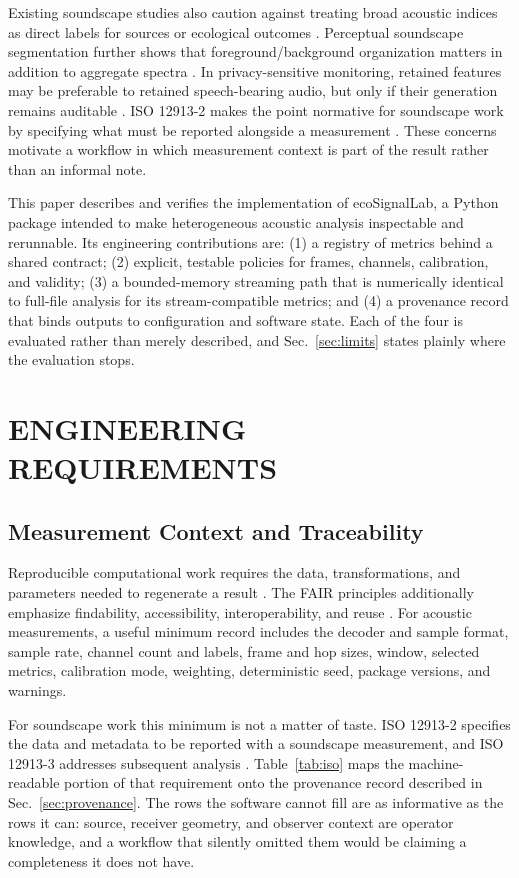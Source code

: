 \documentclass[final]{jaes}
\begin{document}
Existing soundscape studies also caution against treating broad acoustic indices as direct labels for sources or ecological outcomes \cite{sueur2014,bradfer2019}. Perceptual soundscape segmentation further shows that foreground/background organization matters in addition to aggregate spectra \cite{thorogood2016}. In privacy-sensitive monitoring, retained features may be preferable to retained speech-bearing audio, but only if their generation remains auditable \cite{bitzer2016}. ISO 12913-2 makes the point normative for soundscape work by specifying what must be reported alongside a measurement \cite{iso12913-2}. These concerns motivate a workflow in which measurement context is part of the result rather than an informal note.

This paper describes and verifies the implementation of ecoSignalLab, a Python package intended to make heterogeneous acoustic analysis inspectable and rerunnable. Its engineering contributions are: (1) a registry of \eslMetricTotal{} metrics behind a shared contract; (2) explicit, testable policies for frames, channels, calibration, and validity; (3) a bounded-memory streaming path that is numerically identical to full-file analysis for its \eslMetricStreaming{} stream-compatible metrics; and (4) a provenance record that binds outputs to configuration and software state. Each of the four is evaluated rather than merely described, and Sec.~\ref{sec:limits} states plainly where the evaluation stops.

\section{ENGINEERING REQUIREMENTS}

\subsection{Measurement Context and Traceability}

Reproducible computational work requires the data, transformations, and parameters needed to regenerate a result \cite{sandve2013}. The FAIR principles additionally emphasize findability, accessibility, interoperability, and reuse \cite{wilkinson2016}. For acoustic measurements, a useful minimum record includes the decoder and sample format, sample rate, channel count and labels, frame and hop sizes, window, selected metrics, calibration mode, weighting, deterministic seed, package versions, and warnings.

For soundscape work this minimum is not a matter of taste. ISO 12913-2 specifies the data and metadata to be reported with a soundscape measurement, and ISO 12913-3 addresses subsequent analysis \cite{iso12913-2,iso12913-3}. Table~\ref{tab:iso} maps the machine-readable portion of that requirement onto the provenance record described in Sec.~\ref{sec:provenance}. The rows the software cannot fill are as informative as the rows it can: source, receiver geometry, and observer context are operator knowledge, and a workflow that silently omitted them would be claiming a completeness it does not have.
\end{document}
